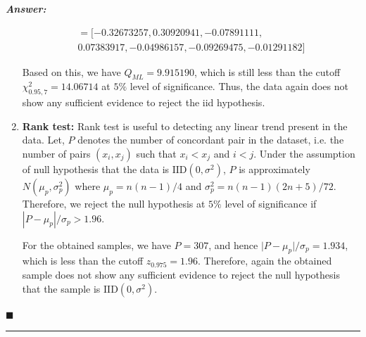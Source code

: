 \documentclass[12pt]{article}
\theoremstyle{definition}
\newenvironment{answer}{
    \textbf{\textit{Answer:}} \qquad
}{\hfill $\blacksquare$ \\ \begin{center}
    \rule{0.6\linewidth}{0.5px}    
\end{center}
}
\begin{document}
\begin{answer}
\begin{enumerate}
        \begin{multline*}
            [\widehat{\rho}_{WW}(1), \widehat{\rho}_{WW}(2), \ldots, \widehat{\rho}_{WW}(7)] =
            [-0.32673257,  0.30920941, -0.07891111, \\
             0.07383917, -0.04986157, -0.09269475, -0.01291182]
        \end{multline*}

        Based on this, we have $Q_{ML} = 9.915190$, which is still less than the cutoff $\chi^2_{0.95, 7} = 14.06714$ at $5\%$ level of significance. Thus, the data again does not show any sufficient evidence to reject the iid hypothesis.

        \item \textbf{Rank test:} Rank test is useful to detecting any linear trend present in the data. Let, $P$ denotes the number of concordant pair in the dataset, i.e. the number of pairs $(x_i, x_j)$ such that $x_i < x_j$ and $i < j$. Under the assumption of null hypothesis that the data is $\text{IID}(0, \sigma^2)$, $P$ is approximately $N(\mu_p, \sigma_p^2)$ where $\mu_p = n(n-1)/4$ and $\sigma_p^2 = n(n-1)(2n + 5)/72$. Therefore, we reject the null hypothesis at $5\%$ level of significance if $|P-\mu_p| / \sigma_p > 1.96$. 
        
        For the obtained samples, we have $P = 307$, and hence $\vert P - \mu_p \vert / \sigma_p = 1.934$, which is less than the cutoff $z_{0.975} = 1.96$. Therefore, again the obtained sample does not show any sufficient evidence to reject the null hypothesis that the sample is $\text{IID}(0, \sigma^2)$.
    \end{enumerate}
\end{answer}
\end{document}

